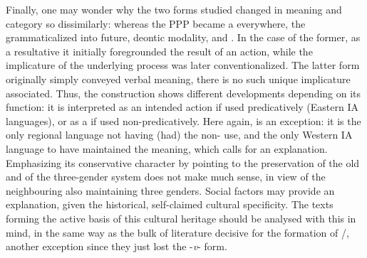 \documentclass[output=paper]{langsci/langscibook}
\begin{document}
  Finally, one may wonder why the two forms studied changed in meaning and category so dissimilarly: whereas the PPP became a  everywhere, the  grammaticalized into future, deontic modality,  and . In the case of the former, as a resultative  it initially foregrounded the result of an action, while the implicature of the underlying process was later conventionalized. The latter form originally simply conveyed verbal meaning, there is no such unique implicature associated. Thus, the construction shows different developments depending on its function: it is interpreted as an intended action if used predicatively (Eastern IA languages), or as a  if used non-predicatively. Here again,  is an exception: it is the only regional language not having (had) the non- use, and the only Western IA language to have maintained the   meaning, which calls for an explanation. Emphasizing its conservative character by pointing to the preservation of the old  and of the three-gender system does not make much sense, in view of the neighbouring  also maintaining three genders. Social factors may provide an explanation, given the historical, self-claimed cultural  specificity. The texts forming the active basis of this cultural heritage should be analysed with this in mind, in the same way as the bulk of literature decisive for the formation of /, another exception since they just lost the -\textit{v}{}- form.
 
 

{\sloppy
\printbibliography[heading=subbibliography,notkeyword=this]
}
\end{document}

